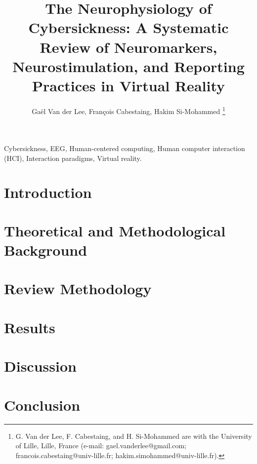 \documentclass[lettersize,journal]{IEEEtran}
\begin{document}
\title{The Neurophysiology of Cybersickness: A Systematic Review of Neuromarkers, Neurostimulation, and Reporting Practices in Virtual Reality}

\author{Gaël Van der Lee, François Cabestaing, Hakim Si-Mohammed
\thanks{G. Van der Lee, F. Cabestaing, and H. Si-Mohammed are with the University of Lille, Lille, France (e-mail: gael.vanderlee@gmail.com; francois.cabestaing@univ-lille.fr; hakim.simohammed@univ-lille.fr).}}

\maketitle

\begin{abstract}
  
\end{abstract}

\begin{IEEEkeywords}
Cybersickness, EEG, Human-centered computing, Human computer interaction (HCI), Interaction paradigms, Virtual reality.
\end{IEEEkeywords}

\section{Introduction}


\section{Theoretical and Methodological Background}\label{sec:theoretical}


\section{Review Methodology}\label{sec:methodology}


\section{Results}\label{sec:results}


\section{Discussion}\label{sec:discussion}


\section{Conclusion}\label{sec:conclusion}

\end{document}
